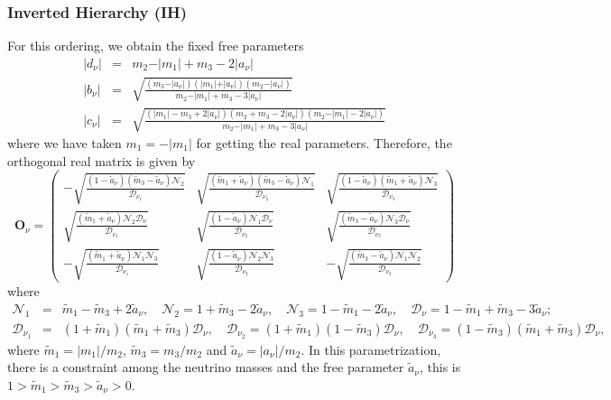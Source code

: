 \documentclass[aps,prd,groupaddress,floatfix,tighten,nofootinbib,showpacs,amsfonts,superscriptaddress]{revtex4-2}
\newcommand{\nn}{\nonumber}
\begin{document}
\subsubsection{Inverted Hierarchy (IH)}
For this ordering, we obtain the fixed free parameters
\begin{eqnarray}
\vert d_{\nu}\vert&=& m_{2}-\vert m_{1}\vert+m_{3}-2\vert a_{\nu}\vert\nn\\
\vert b_{\nu}\vert&=&\sqrt{\frac{(m_{3}-\vert a_{\nu}\vert)(\vert m_{1}\vert+\vert a_{\nu}\vert)(m_{2}-\vert a_{\nu}\vert)}{m_{2}-\vert m_{1}\vert+m_{3}-3\vert a_{\nu}\vert}}\nn\\
\vert c_{\nu}\vert&=&\sqrt{\frac{(\vert m_{1}\vert-m_{3}+2\vert a_{\nu}\vert)(m_{2}+ m_{3}-2\vert a_{\nu}\vert)(m_{2}-\vert m_{1}\vert-2\vert a_{\nu}\vert)}{m_{2}-\vert m_{1}\vert +m_{3}-3\vert a_{\nu}\vert}}\label{fpio}
\end{eqnarray}
where we have taken $m_{1}=-\vert m_{1}\vert$ for getting the real parameters. Therefore, the orthogonal real matrix is given by
\begin{equation}
\mathbf{O}_{\nu}=\begin{pmatrix}
-\sqrt{\frac{(1-\tilde{a}_{\nu})(\tilde{m}_{3}-\tilde{a}_{\nu})\mathcal{N}_{2}}{\mathcal{D}_{\nu_{1}}}}& \sqrt{\frac{(\tilde{m}_{{1}}+\tilde{a}_{\nu})(\tilde{m}_{3}-\tilde{a}_{\nu})\mathcal{N}_{1}}{\mathcal{D}_{\nu_{2}}}}
& \sqrt{\frac{(1-\tilde{a}_{\nu})(\tilde{m}_{1}+\tilde{a}_{\nu})\mathcal{N}_{3}}{\mathcal{D}_{\nu_{3}}}} 
\\ 
\sqrt{\frac{(\tilde{m}_{1}+\tilde{a}_{\nu})\mathcal{N}_{2}\mathcal{D}_{\nu}}{\mathcal{D}_{\nu_{1}}}}& \sqrt{\frac{(1-\tilde{a}_{\nu})\mathcal{N}_{1}\mathcal{D}_{\nu}}{\mathcal{D}_{\nu_{2}}}}
& \sqrt{\frac{(\tilde{m}_{3}-\tilde{a}_{\nu})\mathcal{N}_{3}\mathcal{D}_{\nu}}{\mathcal{D}_{\nu_{3}}}} \\ 
-\sqrt{\frac{(\tilde{m}_{1}+\tilde{a}_{\nu})\mathcal{N}_{1}\mathcal{N}_{3}}{\mathcal{D}_{\nu_{1}}}}&\sqrt{\frac{(1-\tilde{a}_{\nu})\mathcal{N}_{2}\mathcal{N}_{3}}{\mathcal{D}_{\nu_{2}}}} 
& 
-\sqrt{\frac{(\tilde{m}_{3}-\tilde{a}_{\nu})\mathcal{N}_{1}\mathcal{N}_{2}}{\mathcal{D}_{\nu_{3}}}}
\label{eq88}
\end{pmatrix} 
\end{equation}
where
\begin{eqnarray}
\mathcal{N}_{1}&=&\tilde{m}_{1}-\tilde{m}_{3}+2\tilde{a}_{\nu},\quad 
\mathcal{N}_{2}=1+\tilde{m}_{3}-2\tilde{a}_{\nu},\quad
\mathcal{N}_{3}=1-\tilde{m}_{1}-2\tilde{a}_{\nu}
,\quad
\mathcal{D}_{\nu}=1-\tilde{m}_{1}+\tilde{m}_{3}-3\tilde{a}_{\nu};\nonumber\\
\mathcal{D}_{\nu_{1}}&=&(1+\tilde{m}_{1})( \tilde{m}_{1}+\tilde{m}_{3})\mathcal{D}_{\nu},\quad
\mathcal{D}_{\nu_{2}}=(1+\tilde{m}_{1})( 1-\tilde{m}_{3})\mathcal{D}_{\nu},\quad
\mathcal{D}_{\nu_{3}}=(1- \tilde{m}_{3})(\tilde{m}_{1}+\tilde{m}_{3})\mathcal{D}_{\nu},
\label{eq99}
\end{eqnarray}
where $\tilde{m}_{{1}}=\vert m_{{1}}\vert /m_{2}$, $\tilde{m}_{3}=m_{3}/m_{2}$ and $\tilde{a}_{\nu}=\vert a_{\nu}\vert/ m_{2}$. In this parametrization, there is a constraint among the neutrino masses and the free parameter $\tilde{a}_{\nu}$, this is $1>\tilde{m}_{1}>\tilde{m}_{3}>\tilde{a}_{\nu}>0$.
\end{document}
